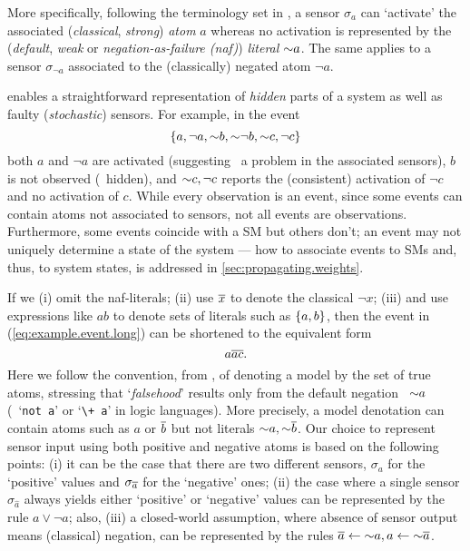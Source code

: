 \documentclass[x11names]{tlp}
\renewcommand{\cite}{\citep}
\begin{document}
More specifically, following the terminology set in \cite{calimeri2020aspcore}, a sensor $\sigma_a$ can `activate' the associated (\emph{classical}, \emph{strong}) \emph{atom} $a$ whereas no activation is represented by the (\emph{default}, \emph{weak} or \emph{negation-as-failure (naf)}) \emph{literal} $\operatorname{\sim\!} a$. The same applies to a sensor $\sigma_{\neg a}$ associated to the (classically) negated atom $\neg a$.

%
 enables a straightforward representation of \emph{hidden} parts of a system as well as faulty (\emph{stochastic}) sensors. For example, in the event
\begin{equation}
	\left\{ a, \neg a, \operatorname{\sim\!} b, \operatorname{\sim\!} \neg b, \operatorname{\sim\!} c, \neg c \right\}\label{eq:example.event.long}	
\end{equation}
both $a$ and $\neg a$ are activated (suggesting \eg\ a problem in the associated sensors), $b$ is not observed (\ie\ hidden), and $\operatorname{\sim\!} c, \neg c$ reports the (consistent) activation of $\neg c$ and no activation of $c$.
While every observation is an event, since some events can contain atoms not associated to sensors, not all events are observations. Furthermore, some events coincide with a \acl{SM} but others don't; an event may not uniquely determine a state of the system --- how to associate events to \aclp*{SM} and, thus, to system states, is addressed in \cref{sec:propagating.weights}.


If we (i) omit the naf-literals; (ii) use $\overline{x}$ to denote the classical $\neg x$; (iii) and use expressions like $ab$ to denote sets of literals such as $\set{a, b}$, then the event in (\ref{eq:example.event.long}) can be shortened to the equivalent form
\begin{equation}	
	a\overline{a}\overline{c}.\label{eq:example.event.short}
\end{equation}
%
Here we follow the convention, from \cite{gelfond1988stable}, of denoting a model by the set of true atoms, stressing that `\emph{falsehood}' results only from the default negation \ie\ $\operatorname{\sim\!} a$ (\ie\ `\texttt{not a}' or `\texttt{\textbackslash+ a}' in logic languages).
More precisely, a model denotation can contain atoms such as $a$ or $\overline{b}$ but not literals $\operatorname{\sim\!} a, \operatorname{\sim\!} \overline{b}$. 
%
Our choice to represent sensor input using both positive and negative atoms is based on the following points: 
(i) it can be the case that there are two different sensors, $\sigma_a$ for the `positive' values and $\sigma_{\overline{a}}$ for the `negative' ones;
(ii) the case where a single sensor $\sigma_{\hat{a}}$ always yields either `positive' or `negative' values can be represented by the rule $a \vee \neg a$; also, 
(iii) a closed-world assumption, where absence of sensor output means (classical) negation, can be represented by the rules $\overline{a} \leftarrow \operatorname{\sim\!} a, a \leftarrow \operatorname{\sim\!} \overline{a}$. 
\end{document}
